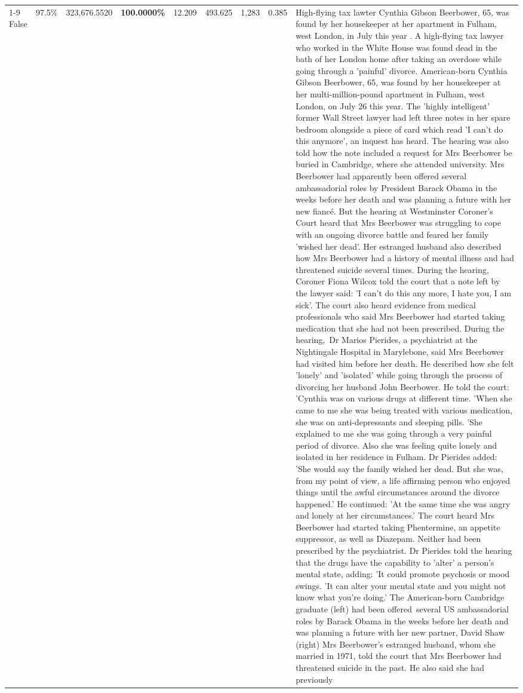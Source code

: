 \begin{table}[H]
\begin{tabular}{lllrlllll}
\cline{1-9}
False & 97.5\% & 323,676.5520 & \bfseries \color{red} 100.0000\% & 12.209 & 493.625 & 1,283 & 0.385 & High-flying tax lawter Cynthia Gibson Beerbower, 65, was found by her housekeeper at her apartment in Fulham, west London, in July this year . A high-flying tax lawyer who worked in the White House was found dead in the bath of her London home after taking an overdose while going through a 'painful' divorce. American-born Cynthia Gibson Beerbower, 65, was found by her housekeeper at her multi-million-pound apartment in Fulham, west London, on July 26 this year. The 'highly intelligent' former Wall Street lawyer had left three notes in her spare bedroom alongside a piece of card which read 'I can't do this anymore', an inquest has heard. The hearing was also told how the note included a request for Mrs Beerbower be buried in Cambridge, where she attended university. Mrs Beerbower had apparently been offered several ambassadorial roles by President Barack Obama in the weeks before her death and was planning a future with her new fiancé. But the hearing at Westminster Coroner's Court heard that Mrs Beerbower was struggling to cope with an ongoing divorce battle and feared her family 'wished her dead'. Her estranged husband also described how Mrs Beerbower had a history of mental illness and had threatened suicide several times. During the hearing, Coroner Fiona Wilcox told the court that a note left by the lawyer said: 'I can't do this any more, I hate you, I am sick'. The court also heard evidence from medical professionals who said Mrs Beerbower had started taking medication that she had not been prescribed. During the hearing, Dr Marios Pierides, a psychiatrist at the Nightingale Hospital in Marylebone, said Mrs Beerbower had visited him before her death. He described how she felt 'lonely' and 'isolated' while going through the process of divorcing her husband John Beerbower. He told the court: 'Cynthia was on various drugs at different time. 'When she came to me she was being treated with various medication, she was on anti-depressants and sleeping pills. 'She explained to me she was going through a very painful period of divorce. Also she was feeling quite lonely and isolated in her residence in Fulham. Dr Pierides added: 'She would say the family wished her dead. But she was, from my point of view, a life affirming person who enjoyed things until the awful circumstances around the divorce happened.' He continued: 'At the same time she was angry and lonely at her circumstances.' The court heard Mrs Beerbower had started taking Phentermine, an appetite suppressor, as well as Diazepam. Neither had been prescribed by the psychiatrist. Dr Pierides told the hearing that the drugs have the capability to 'alter' a person's mental state, adding: 'It could promote psychosis or mood swings. 'It can alter your mental state and you might not know what you're doing.' The American-born Cambridge graduate (left) had been offered several US ambassadorial roles by Barack Obama in the weeks before her death and was planning a future with her new partner, David Shaw (right) Mrs Beerbower's estranged husband, whom she married in 1971, told the court that Mrs Beerbower had threatened suicide in the past. He also said she had previously 
\end{tabular}
\end{table}
